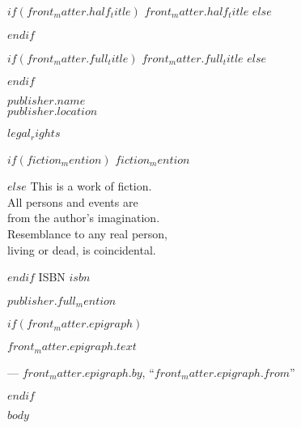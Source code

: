 \documentclass[v2,$lang$]{novel} %
\begin{document}
\frontmatter

\thispagestyle{empty}
$if(front_matter.half_title)$
$front_matter.half_title$
$else$
\vspace*{6\nbs}
\hfill\charscale[2.4]{\textbf{\theTitle}}\par
$endif$
\clearpage

\thispagestyle{empty}
\null
\clearpage

\thispagestyle{empty}
\vspace*{5\nbs}
\begin{center}
$if(front_matter.full_title)$
$front_matter.full_title$
$else$
\charscale[3.6]{\textbf{\theTitle}}\par
$endif$
\vspace{1.5\nbs}
\charscale[1.6]{\theSubtitle}\par
\vspace{4\nbs}
\vspace{4\nbs}
{\theAuthor}
\vfill
{ $publisher.name$\\
$publisher.location$}\par

\end{center}
\clearpage


\thispagestyle{empty}
\begin{center}
\itshape{
\null
\vfill
\textsc{\theTitle}\par
\par

$legal_rights$\par
\null
$if(fiction_mention)$
$fiction_mention$\par
$else$
This is a work of fiction.\\
All persons and events are\\
from the author's imagination.\\
Resemblance to any real person,\\
living or dead, is coincidental.\par
$endif$
\null
ISBN $isbn$\par %
\null

$publisher.full_mention$
} %
\end{center}
\clearpage


$if(front_matter.epigraph)$
\thispagestyle{empty}
\vspace*{7\nbs}
\begin{adjustwidth}{4em}{4em}
{\itshape \noindent $front_matter.epigraph.text$\par}
\hfill--- $front_matter.epigraph.by$, ``$front_matter.epigraph.from$''\par
\end{adjustwidth}
$endif$

$body$
\end{document}
